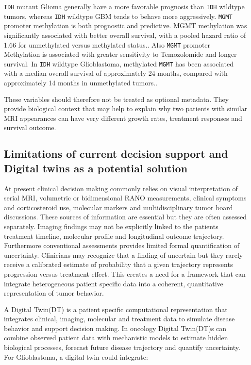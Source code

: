 \texttt{IDH} mutant Glioma generally have a more favorable prognosis than \texttt{IDH} wildtype tumors, whereas \texttt{IDH} wildtype GBM tends to behave more aggressively. \texttt{MGMT} promoter methylation is both prognostic and predictive. MGMT methylation was significantly associated with better overall survival, with a pooled hazard ratio of 1.66 for unmethylated versus methylated status.\cite{noroxe2016hallmarks}. Also \texttt{MGMT} promoter Methylation is associated with greater sensitivity to Temozolomide and longer survival. In \texttt{IDH} wildtype Glioblastoma, methylated \texttt{MGMT} has been associated with a median overall survival of approximately 24 months, compared with approximately 14 months in unmethylated tumors.\cite{melhem2022updates}.

These variables should therefore not be treated as optional metadata. They provide biological context that may help to explain why two patients with similar MRI appearances can have very different growth rates, treatment responses and survival outcome.

\subsection{Limitations of current decision support and Digital twins as a potential solution}

At present clinical decision making commonly relies on visual interpretation of serial MRI, volumetric or bidimensional RANO measurements, clinical symptoms and corticosteroid use, molecular markers and multidisciplinary tumor board discussions. These sources of information are essential but they are often assessed separately. Imaging findings may not be explicitly linked to the patients treatment timeline, molecular profile and longitudinal outcome trajectory. Furthermore conventional assessments provides limited formal quantification of uncertainty. Clinicians may recognize that a finding of uncertain but they rarely receive a calibrated estimate of probability that a given trajectory represents progression versus treatment effect. This creates a need for a framework that can integrate heterogeneous patient specific data into a coherent, quantitative representation of tumor behavior\cite{luemerson2026corticosteroids}.

A Digital Twin(DT) is a patient specific computational representation that integrates clinical, imaging, molecular and treatment data to simulate disease behavior and support decision making. In oncology Digital Twin(DT)s can combine observed patient data with mechanistic models to estimate hidden biological processes, forecast future disease trajectory and quantify uncertainty. For Glioblastoma, a digital twin could integrate:

